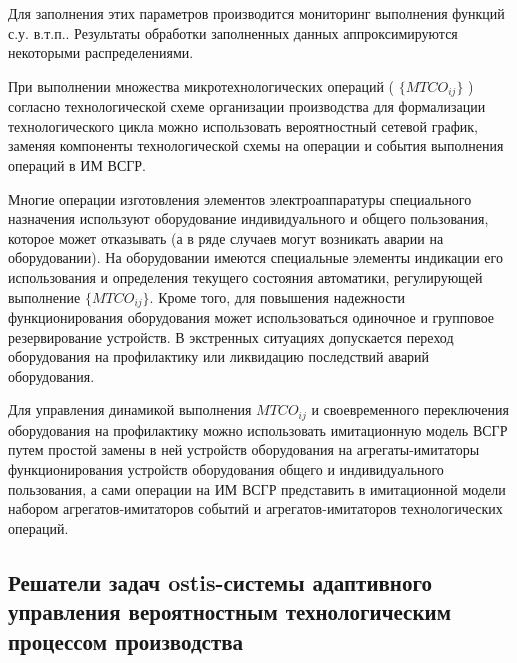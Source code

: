 Для заполнения этих параметров производится мониторинг выполнения функций с.у. в.т.п.. Результаты обработки заполненных данных аппроксимируются некоторыми распределениями.

При выполнении множества микротехнологических операций ( $\{MTCO_{ij}\}$ ) согласно технологической схеме организации производства для формализации технологического цикла можно использовать вероятностный сетевой график, заменяя компоненты технологической схемы на операции и события выполнения операций в ИМ ВСГР. 

Многие операции изготовления элементов электроаппаратуры специального назначения используют оборудование индивидуального и общего пользования, которое может отказывать (а в ряде случаев могут возникать аварии на оборудовании). На оборудовании имеются специальные элементы индикации его использования и определения текущего состояния автоматики, регулирующей выполнение $\{MTCO_{ij}\}$. Кроме того, для повышения надежности функционирования оборудования может использоваться одиночное и групповое резервирование устройств. В экстренных ситуациях допускается переход оборудования на профилактику или ликвидацию последствий аварий оборудования.

Для управления динамикой выполнения $MTCO_{ij}$ и своевременного переключения оборудования на профилактику можно использовать имитационную модель ВСГР путем простой замены в ней устройств оборудования на агрегаты-имитаторы функционирования устройств оборудования общего и индивидуального пользования, а сами операции на ИМ ВСГР представить в имитационной модели набором агрегатов-имитаторов событий и агрегатов-имитаторов технологических операций.



\subsection{Решатели задач ostis-системы адаптивного управления вероятностным технологическим процессом производства}
\label{sec_chapter_enterprise_solvers}

